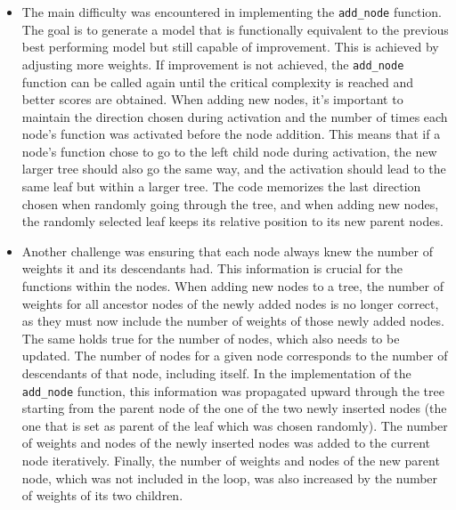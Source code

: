\begin{itemize}
  \item The main difficulty was encountered in implementing the \texttt{add\_node} function. The goal is to generate a model that is functionally equivalent to the previous best performing model but still capable of improvement. This is achieved by adjusting more weights. If improvement is not achieved, the \texttt{add\_node} function can be called again until the critical complexity is reached and better scores are obtained. When adding new nodes, it's important to maintain the direction chosen during activation and the number of times each node's function was activated before the node addition. This means that if a node's function chose to go to the left child node during activation, the new larger tree should also go the same way, and the activation should lead to the same leaf but within a larger tree. The code memorizes the last direction chosen when randomly going through the tree, and when adding new nodes, the randomly selected leaf keeps its relative position to its new parent nodes.

  \item Another challenge was ensuring that each node always knew the number of weights it and its descendants had. This information is crucial for the functions within the nodes. When adding new nodes to a tree, the number of weights for all ancestor nodes of the newly added nodes is no longer correct, as they must now include the number of weights of those newly added nodes. The same holds true for the number of nodes, which also needs to be updated. The number of nodes for a given node corresponds to the number of descendants of that node, including itself. In the implementation of the \texttt{add\_node} function, this information was propagated upward through the tree starting from the parent node of the one of the two newly inserted nodes (the one that is set as parent of the leaf which was chosen randomly). The number of weights and nodes of the newly inserted nodes was added to the current node iteratively. Finally, the number of weights and nodes of the new parent node, which was not included in the loop, was also increased by the number of weights of its two children.
\end{itemize}